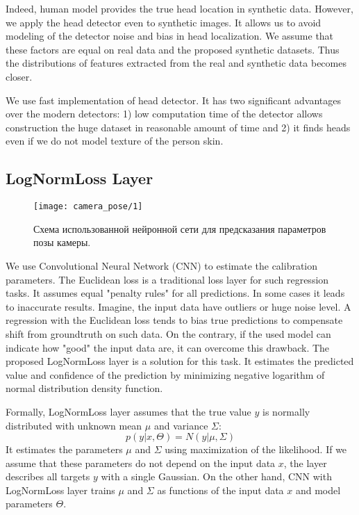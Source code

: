 Indeed, human model \cite{pishchulin2015building} provides the true head location in synthetic data. However, we apply the head detector even to synthetic images. It allows us to avoid modeling of the detector noise and bias in head localization. We assume that these factors are equal on real data and the proposed synthetic datasets. Thus the distributions of features extracted from the real and synthetic data becomes closer.

We use fast implementation \cite{prisacariu2009fasthog} of head detector. It has two significant advantages over the modern detectors: 1) low computation time of the detector allows construction the huge dataset in reasonable amount of time and 2) it finds heads even if we do not model texture of the person skin.

\subsection{LogNormLoss Layer}
\label{sec:lognormloss}


\begin{figure*}[!t]
	\centering
	\texttt{[image: camera\_pose/1]}
	\caption{Схема использованной нейронной сети для предсказания параметров позы камеры.}
	\label{fig:net}
\end{figure*}


We use Convolutional Neural Network (CNN) to estimate the calibration parameters. The Euclidean loss is a traditional loss layer for such regression tasks. It assumes equal "penalty rules" for all predictions. In some cases it leads to inaccurate results. Imagine, the input data have outliers or huge noise level. A regression with the Euclidean loss tends to bias true predictions to compensate shift from groundtruth on such data. On the contrary, if the used model can indicate how "good" the input data are, it can overcome this drawback. The proposed LogNormLoss layer is a solution for this task. It estimates the predicted value and confidence of the prediction by minimizing negative logarithm of normal distribution density function.

Formally, LogNormLoss layer assumes that the true value $y$ is normally distributed with unknown mean $\mu$ and variance $\Sigma$:
\begin{equation}
p(y|x, \Theta) = N(y|\mu, \Sigma)
\end{equation}
It estimates the parameters $\mu$ and $\Sigma$ using maximization of the likelihood. If we assume that these parameters do not depend on the input data $x$, the layer describes all targets $y$ with a single Gaussian. On the other hand, CNN with LogNormLoss layer trains $\mu$ and $\Sigma$ as functions of the input data $x$ and model parameters $\Theta$.

